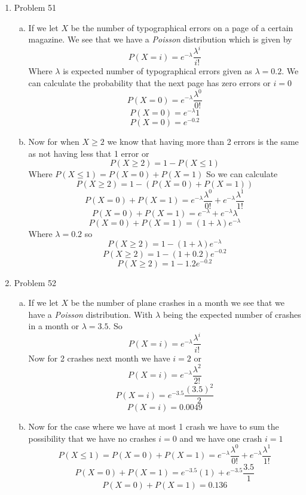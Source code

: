 \documentclass[11pt]{article}
\begin{document}
\begin{enumerate}
\item Problem 51
\begin{enumerate}[(a)]
\item
If we let $X$ be the number of typographical errors on a page of a certain magazine. We see that we have a \emph{Poisson} distribution which is given by
$$P(X=i) = e^{-\lambda}\frac{\lambda^i}{i!}$$
Where $\lambda$ is expected number of typographical errors given as $\lambda =0.2$. We can calculate the probability that the next page has zero errors or $i=0$
$$P(X=0) = e^{-\lambda}\frac{\lambda^0}{0!}$$
$$P(X=0) = e^{-\lambda}1$$
$$P(X=0) = e^{-0.2}$$
\item
Now for when $X\ge2$ we know that having more than 2 errors is the same as not having less that 1 error or
$$P(X\ge2) = 1 - P(X\le1)$$
Where $P(X\le1)=P(X=0)+P(X=1)$
So we can calculate
$$P(X\ge2) = 1 - (P(X=0)+P(X=1))$$
$$P(X=0)+P(X=1) = e^{-\lambda}\frac{\lambda^0}{0!} + e^{-\lambda}\frac{\lambda^1}{1!}$$
$$P(X=0)+P(X=1) = e^{-\lambda}+ e^{-\lambda}\lambda$$
$$P(X=0)+P(X=1) = (1+\lambda)e^{-\lambda}$$
Where $\lambda = 0.2$ so 
$$P(X\ge2) = 1 - (1+\lambda)e^{-\lambda}$$
$$P(X\ge2) = 1 - (1+0.2)e^{-0.2}$$
$$P(X\ge2) = 1 - 1.2e^{-0.2}$$
\end{enumerate} 

\item Problem 52
\begin{enumerate}[(a)]
\item
If we let $X$ be the number of plane crashes in a month we see that we have a \emph{Poisson} distribution. With $\lambda$ being the expected number of crashes in a month or $\lambda = 3.5$. So
$$P(X=i) = e^{-\lambda}\frac{\lambda^i}{i!}$$
Now for 2 crashes next month we have $i=2$ or
$$P(X=i) = e^{-\lambda}\frac{\lambda^2}{2!}$$
$$P(X=i) = e^{-3.5}\frac{(3.5)^2}{2}$$
$$P(X=i) = 0.0049$$
\item
Now for the case where we have at most 1 crash we have to sum the possibility that we have no crashes $i=0$ and we have one crash $i=1$
$$P(X\le1)=P(X=0)+P(X=1)= e^{-\lambda}\frac{\lambda^0}{0!}+e^{-\lambda}\frac{\lambda^1}{1!}$$
$$P(X=0)+P(X=1)= e^{-3.5}(1)+e^{-3.5}\frac{3.5}{1}$$
$$P(X=0)+P(X=1)= 0.136$$
\end{enumerate}


\end{enumerate}
\end{document}
